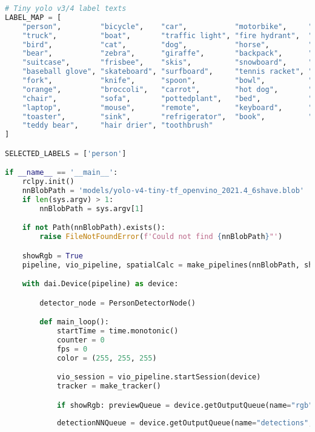 \begin{lstlisting}[language=python,frame=single]
# Tiny yolo v3/4 label texts
LABEL_MAP = [
    "person",         "bicycle",    "car",           "motorbike",     "aeroplane",   "bus",           "train",
    "truck",          "boat",       "traffic light", "fire hydrant",  "stop sign",   "parking meter", "bench",
    "bird",           "cat",        "dog",           "horse",         "sheep",       "cow",           "elephant",
    "bear",           "zebra",      "giraffe",       "backpack",      "umbrella",    "handbag",       "tie",
    "suitcase",       "frisbee",    "skis",          "snowboard",     "sports ball", "kite",          "baseball bat",
    "baseball glove", "skateboard", "surfboard",     "tennis racket", "bottle",      "wine glass",    "cup",
    "fork",           "knife",      "spoon",         "bowl",          "banana",      "apple",         "sandwich",
    "orange",         "broccoli",   "carrot",        "hot dog",       "pizza",       "donut",         "cake",
    "chair",          "sofa",       "pottedplant",   "bed",           "diningtable", "toilet",        "tvmonitor",
    "laptop",         "mouse",      "remote",        "keyboard",      "cell phone",  "microwave",     "oven",
    "toaster",        "sink",       "refrigerator",  "book",          "clock",       "vase",          "scissors",
    "teddy bear",     "hair drier", "toothbrush"
]

SELECTED_LABELS = ['person']

if __name__ == '__main__':
    rclpy.init()
    nnBlobPath = 'models/yolo-v4-tiny-tf_openvino_2021.4_6shave.blob'
    if len(sys.argv) > 1:
        nnBlobPath = sys.argv[1]

    if not Path(nnBlobPath).exists():
        raise FileNotFoundError(f'Could not find {nnBlobPath}"')

    showRgb = True
    pipeline, vio_pipeline, spatialCalc = make_pipelines(nnBlobPath, showRgb)

    with dai.Device(pipeline) as device:

        detector_node = PersonDetectorNode()

        def main_loop():
            startTime = time.monotonic()
            counter = 0
            fps = 0
            color = (255, 255, 255)

            vio_session = vio_pipeline.startSession(device)
            tracker = make_tracker()

            if showRgb: previewQueue = device.getOutputQueue(name="rgb", maxSize=4, blocking=False)
            
            detectionNNQueue = device.getOutputQueue(name="detections", maxSize=4, blocking=False)


\end{lstlisting}
